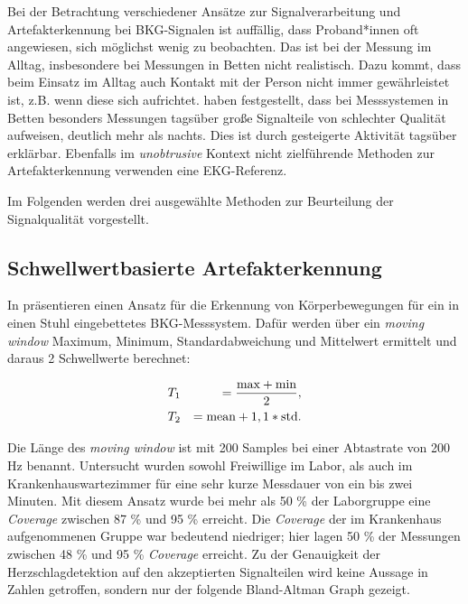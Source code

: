 	Bei der Betrachtung verschiedener Ansätze zur Signalverarbeitung und Artefakterkennung bei \ac{BKG}-Signalen ist auffällig, dass Proband*innen oft angewiesen, sich möglichst wenig zu beobachten. Das ist bei der Messung im Alltag, insbesondere bei Messungen in Betten nicht realistisch. Dazu kommt, dass beim Einsatz im Alltag auch Kontakt mit der Person nicht immer gewährleistet ist, z.B. wenn diese sich aufrichtet. \citeauthor{HoogAntink2020} haben festgestellt, dass bei Messsystemen in Betten besonders Messungen tagsüber große Signalteile von schlechter Qualität aufweisen, deutlich mehr als nachts. Dies ist durch gesteigerte Aktivität tagsüber erklärbar. Ebenfalls im \textit{unobtrusive} Kontext nicht zielführende Methoden zur Artefakterkennung verwenden eine \ac{EKG}-Referenz.
	
	Im Folgenden werden drei ausgewählte Methoden zur Beurteilung der Signalqualität vorgestellt.

	\subsection{Schwellwertbasierte Artefakterkennung}
	
	In  präsentieren \citeauthor{Pino2015} einen Ansatz für die Erkennung von Körperbewegungen für ein in einen Stuhl eingebettetes \ac{BKG}-Messsystem. Dafür werden über ein \textit{moving window} Maximum, Minimum, Standardabweichung und Mittelwert ermittelt und daraus 2 Schwellwerte berechnet:
	
	\begin{eqnarray*}
		&T_1 &= \frac{\text{max} + \text{min}}{2},\notag\\
		&T_2 &= \text{mean} + 1,1 * \text{std}.\notag
	\end{eqnarray*}
	
	Die Länge des \textit{moving window} ist mit 200 Samples bei einer Abtastrate von 200 Hz benannt. Untersucht wurden sowohl Freiwillige im Labor, als auch im Krankenhauswartezimmer für eine sehr kurze Messdauer von ein bis zwei Minuten. Mit diesem Ansatz wurde bei mehr als 50 \% der Laborgruppe eine \textit{Coverage} zwischen 87 \% und 95 \% erreicht. Die \textit{Coverage} der im Krankenhaus aufgenommenen Gruppe war bedeutend niedriger; hier lagen 50 \% der Messungen zwischen 48 \% und 95 \% \textit{Coverage} erreicht. Zu der Genauigkeit der Herzschlagdetektion auf den akzeptierten Signalteilen wird keine Aussage in Zahlen getroffen, sondern nur der folgende Bland-Altman Graph gezeigt.
	
